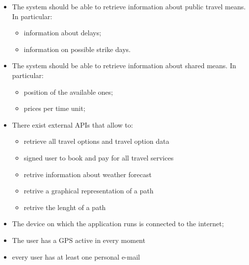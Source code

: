 \begin{itemize}

\item The system should be able to retrieve information about public travel means. In particular:
\begin{itemize}
\item information about delays;
\item information on possible strike days.
\end{itemize}

\item The system should be able to retrieve information about shared means. In particular:
\begin{itemize}
\item position of the available ones;
\item prices per time unit;
\end{itemize}

\item There exist external APIs that allow to:
\begin{itemize}
\item retrieve all travel options and travel option data
\item signed user to book and pay for all travel services
\item retrive information about weather forecast
\item retrive a graphical representation of a path
\item retrive the lenght of a path
\end{itemize}


\item The device on which the application runs is connected to the internet;

\item The user has a GPS active in every moment
\item every user has at least one personal e-mail 

\end{itemize}




